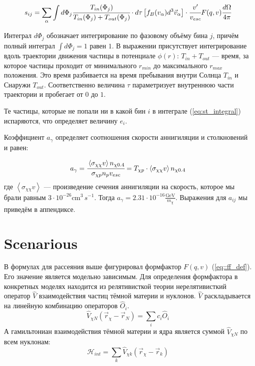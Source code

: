 \documentclass[a4paper, 14pt]{article}
\newcommand{\avarage}[1]{\left\langle #1 \right\rangle}
\begin{document}
\begin{equation}
	\label{eq:st_integral}
	s_{ij} = \sum_{\alpha}\int{
		d\Phi_{j}
		\cfrac{T_{in}(\Phi_{j})}{
			T_{in}(\Phi_{j})+T_{out}(\Phi_{j})
		} \cdot d\tau \left[ f_B(v_{\alpha}) d^3 \vec{v}_{\alpha} \right] \cdot \cfrac{v'}{v_{esc}} F(q,v) \cfrac{d\Omega}{4\pi}
	}
\end{equation}

\noindent Интеграл $d\Phi_{j}$ обозначает интегрирование по фазовому объёму бина $j$, причём полный интеграл $\int{d\Phi_{j}} = 1$ равен $1$. В выражении присутствует интегрирование вдоль траектории движения частицы в потенциале $\phi(r)$: $T_{in} + T_{out}$ --- время, за которое частицы проходит от минимального $r_{min}$ до максимального $r_{max}$ положения. Это время разбивается на время пребывания внутри Солнца $T_{in}$ и Снаружи $T_{out}$. Соответственно величина $\tau$ параметризует внутреннюю части траектории и пробегает от $0$ до $1$.

Те частицы, которые не попали ни в какой бин $i$ в интеграле (\ref{eq:st_integral}) испаряются, что определяет величину $e_i$.

Коэффициент $a_{\gamma}$ определяет соотношения скорости аннигиляции и столкновений и равен:

\begin{equation}
	a_{\gamma} = \cfrac{ \avarage{\sigma_{\chi\chi} v} n_{\chi 0.4}}{\sigma_{\chi p} n_{p} v_{esc}} = 
	T_{\chi p} \cdot \avarage{\sigma_{\chi\chi} v} n_{\chi 0.4}
\end{equation}
где $\avarage{\sigma_{\chi\chi} v}$ --- произведение сечения аннигиляции на скорость, которое мы брали равным $3\cdot10^{-26}\text{cm}^3\,{s^{-1}}$. Тогда $a_{\gamma} = 2.31\cdot10^{-16} \frac{\text{GeV}}{m_{\chi}}$. Выражения для $a_{ij}$ мы приведём в аппендиксе.


	
	\section{Scenarious}
	В формулах для рассеяния выше фигурировал формфактор $F(q,v)$ (\ref{eq::ff_def}). Его значение является модельно зависимым. Для определения формфактора в конкретных моделях находится из релятивисткой теории нерелятивисткий оператор $\hat{V}$ взаимодействия частиц тёмной материи и нуклонов.
$\hat{V}$ раскладывается на линейную комбинацию операторов $\hat{O}_i$.
\begin{equation}
	\hat{V}_{\chi N}(\vec{r}_{\chi} - \vec{r}_{N}) = \sum_i{c_i \hat{O}_i} 
\end{equation}
А гамильтониан взаимодействия тёмной материи и ядра является суммой $\hat{V}_{\chi N}$ по всем нуклонам:
\begin{equation}
	\mathcal{H}_{int} = \sum_{k}{\hat{V}_{\chi k}(\vec{r}_{\chi} - \vec{r}_{k})} 
\end{equation}
\end{document}
